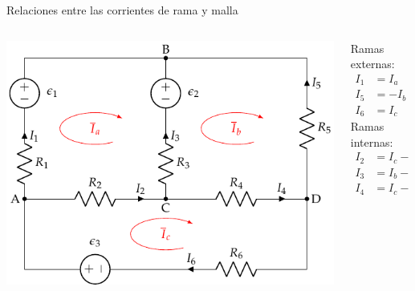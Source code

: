 \documentclass[xcolor={usenames,svgnames,dvipsnames}]{beamer}
\begin{document}
\begin{frame}[label={sec:org866bc92}]{Relaciones entre las corrientes de rama y malla}
\begin{columns}
\begin{column}{0.6\columnwidth}
\begin{center}
\includegraphics[width=.9\linewidth]{figs/mallas1_corrientes.pdf}
\end{center}
\end{column}
\begin{column}{0.4\columnwidth}
Ramas externas:
\begin{align*}
  I_1 &= I_a\\
  I_5 &= -I_b\\
  I_6 &= I_c
\end{align*}
Ramas internas:
\begin{align*}
  I_2 &= I_c -I_a\\
  I_3 &= I_b - I_a\\
  I_4 &= I_c - I_b
\end{align*}
\end{column}
\end{columns}
\end{frame}
\end{document}
